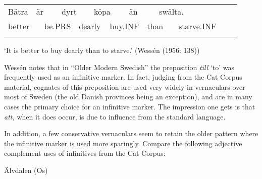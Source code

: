 \begin{tabular}{llllllllllllll}
\lsptoprule
Bätra & \multicolumn{2}{l}{är

} & \multicolumn{2}{l}{dyrt

} & \multicolumn{2}{l}{köpa

} & \multicolumn{2}{l}{än

} & \multicolumn{2}{l}{swälta.

} & \multicolumn{2}{l}{} & \\
\multicolumn{2}{l}{better

} & \multicolumn{2}{l}{be.PRS

} & \multicolumn{2}{l}{dearly

} & \multicolumn{2}{l}{buy.INF

} & \multicolumn{2}{l}{than

} & \multicolumn{2}{l}{starve.INF

} & \multicolumn{2}{l}{}\\
\lspbottomrule
\end{tabular}

\begin{styleTranslation}
‘It is better to buy dearly than to starve.’ (Wessén (1956: 138))

\end{styleTranslation}

\begin{styleBodyTextFirst}
Wessén notes that in “Older Modern Swedish” the preposition \textit{till} ‘to’ was frequently used as an infinitive marker. In fact, judging from the Cat Corpus material, cognates of this preposition are used very widely in vernaculars over most of Sweden (the old Danish provinces being an exception), and are in many cases the primary choice for an infinitive marker. The impression one gets is that \textit{att, }when it does occur, is due to influence from the standard language. 

\end{styleBodyTextFirst}

\begin{styleBodytextC}
In addition, a few conservative vernaculars seem to retain the older pattern where the infinitive marker is used more sparingly. Compare the following adjective complement uses of infinitives from the Cat Corpus:

\end{styleBodytextC}

\begin{listWWNumileveli}
\item {}

\begin{styleExample}
Älvdalen (Os)

\end{styleExample}

\end{listWWNumileveli}

